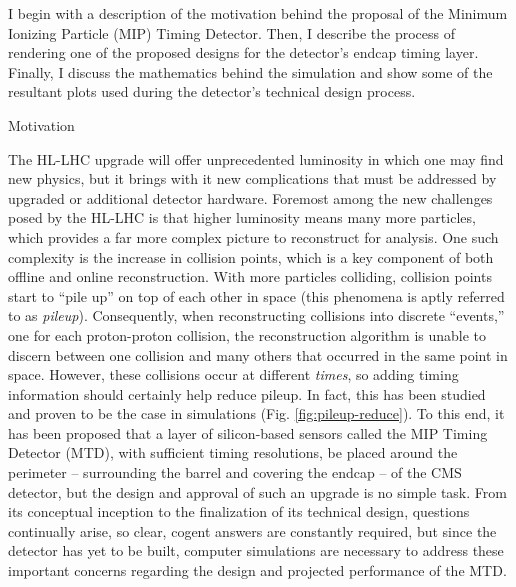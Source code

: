 %
%

I begin with a description of the motivation behind the proposal of the Minimum Ionizing Particle (MIP) Timing Detector. Then, I describe the process of rendering one of the proposed designs for the detector's endcap timing layer. Finally, I discuss the mathematics behind the simulation and show some of the resultant plots used during the detector's technical design process.

\begin{section}{Motivation}

The HL-LHC upgrade will offer unprecedented luminosity in which one may find new physics, but it brings with it new complications that must be addressed by upgraded or additional detector hardware. Foremost among the new challenges posed by the HL-LHC is that higher luminosity means many more particles, which provides a far more complex picture to reconstruct for analysis. One such complexity is the increase in collision points, which is a key component of both offline and online reconstruction. With more particles colliding, collision points start to ``pile up'' on top of each other in space (this phenomena is aptly referred to as \textit{pileup}). Consequently, when reconstructing collisions into discrete ``events,'' one for each proton-proton collision, the reconstruction algorithm is unable to discern between one collision and many others that occurred in the same point in space. However, these collisions occur at different \textit{times}, so adding timing information should certainly help reduce pileup. In fact, this has been studied and proven to be the case in simulations (Fig. \ref{fig:pileup-reduce}). To this end, it has been proposed that a layer of silicon-based sensors called the MIP Timing Detector (MTD), with sufficient timing resolutions, be placed around the perimeter -- surrounding the barrel and covering the endcap -- of the CMS detector, but the design and approval of such an upgrade is no simple task. From its conceptual inception to the finalization of its technical design, questions continually arise, so clear, cogent answers are constantly required, but since the detector has yet to be built, computer simulations are necessary to address these important concerns regarding the design and projected performance of the MTD.


\end{section}
